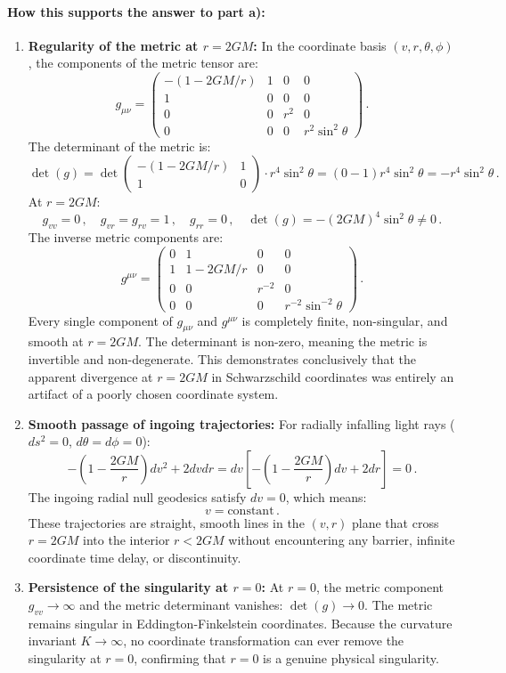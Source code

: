 \documentclass[12pt]{article}
\newcommand{\be}{\begin{equation}}
\newcommand{\ee}{\end{equation}}
\begin{document}
\paragraph{How this supports the answer to part a):}
\begin{enumerate}
    \item \textbf{Regularity of the metric at $r = 2GM$:}
    In the coordinate basis $(v, r, \theta, \phi)$, the components of the metric tensor are:
    \be
    g_{\mu\nu} = \begin{pmatrix}
    -(1 - 2GM/r) & 1 & 0 & 0 \\
    1 & 0 & 0 & 0 \\
    0 & 0 & r^2 & 0 \\
    0 & 0 & 0 & r^2 \sin^2\theta
    \end{pmatrix} \,.
    \ee
    The determinant of the metric is:
    \be
    \det(g) = \det \begin{pmatrix} -(1 - 2GM/r) & 1 \\ 1 & 0 \end{pmatrix} \cdot r^4 \sin^2\theta = (0 - 1) r^4 \sin^2\theta = - r^4 \sin^2\theta \,.
    \ee
    At $r = 2GM$:
    \be
    g_{vv} = 0 \,, \quad g_{vr} = g_{rv} = 1 \,, \quad g_{rr} = 0 \,, \quad \det(g) = - (2GM)^4 \sin^2\theta \neq 0 \,.
    \ee
    The inverse metric components are:
    \be
    g^{\mu\nu} = \begin{pmatrix}
    0 & 1 & 0 & 0 \\
    1 & 1 - 2GM/r & 0 & 0 \\
    0 & 0 & r^{-2} & 0 \\
    0 & 0 & 0 & r^{-2}\sin^{-2}\theta
    \end{pmatrix} \,.
    \ee
    Every single component of $g_{\mu\nu}$ and $g^{\mu\nu}$ is completely finite, non-singular, and smooth at $r = 2GM$. The determinant is non-zero, meaning the metric is invertible and non-degenerate. This demonstrates conclusively that the apparent divergence at $r = 2GM$ in Schwarzschild coordinates was entirely an artifact of a poorly chosen coordinate system.

    \item \textbf{Smooth passage of ingoing trajectories:}
    For radially infalling light rays ($ds^2 = 0$, $d\theta = d\phi = 0$):
    \be
    - \left( 1 - \frac{2GM}{r} \right) dv^2 + 2 dv dr = dv \left[ - \left( 1 - \frac{2GM}{r} \right) dv + 2 dr \right] = 0 \,.
    \ee
    The ingoing radial null geodesics satisfy $dv = 0$, which means:
    \be
    v = \text{constant} \,.
    \ee
    These trajectories are straight, smooth lines in the $(v,r)$ plane that cross $r = 2GM$ into the interior $r < 2GM$ without encountering any barrier, infinite coordinate time delay, or discontinuity.

    \item \textbf{Persistence of the singularity at $r = 0$:}
    At $r = 0$, the metric component $g_{vv} \to \infty$ and the metric determinant vanishes: $\det(g) \to 0$. The metric remains singular in Eddington-Finkelstein coordinates. Because the curvature invariant $K \to \infty$, no coordinate transformation can ever remove the singularity at $r = 0$, confirming that $r = 0$ is a genuine physical singularity.
\end{enumerate}
\end{document}
